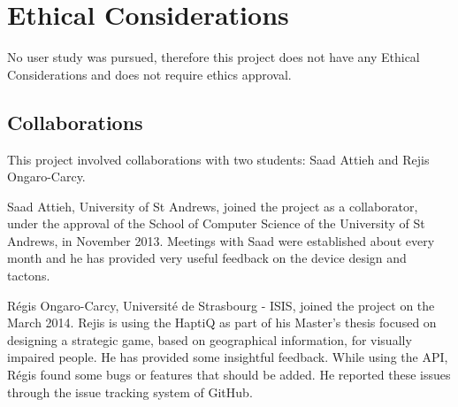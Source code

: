 \chapter{Ethical Considerations}

No user study was pursued, therefore this project does not have any Ethical Considerations and does not require ethics approval.\newline \par

\section{Collaborations}
This project involved collaborations with two students: Saad Attieh and Rejis Ongaro-Carcy.  

Saad Attieh, University of St Andrews, joined the project as a collaborator, under the approval of the School of Computer Science of the University of St Andrews, in November 2013. Meetings with Saad were established about every month and he has provided very useful feedback on the device design and tactons. 

Régis Ongaro-Carcy, Université de Strasbourg - ISIS, joined the project on the  March 2014. Rejis is using the HaptiQ as part of his Master's thesis focused on designing a strategic game, based on geographical information, for visually impaired people. He has provided some insightful feedback. While using the API, Régis found some bugs or features that should be added. He reported these issues through the issue tracking system of GitHub.